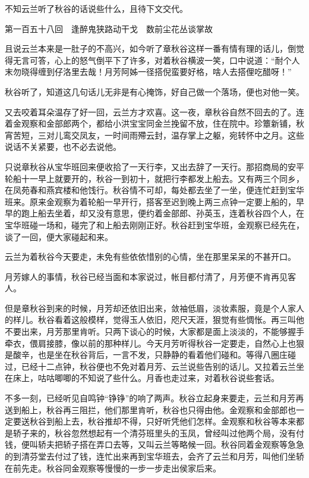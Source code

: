 \documentclass[12pt,UTF8]{ctexbook}
\begin{document}
{{{不知云兰听了秋谷的话说些什么，且待下文交代。





第一百五十八回　逢醉鬼狭路动干戈　数前尘花丛谈掌故





且说云兰本来是一肚子的不高兴，如今听了章秋谷这样一番有情有理的话儿，倒觉得无言可答，心上的怒气倒平下了许多，对着秋谷横波一笑，口中说道：“耐个人末勿晓得缠到仔洛里去哉！月芳阿姊一径搭倪蛮要好格，啥人去搭俚吃醋呀！”

秋谷听了，知道这几句话儿无非是有心掩饰，好自己做一个落场，便也对他一笑。

又去咬着耳朵温存了好一回，云兰方才欢喜。这一夜，章秋谷自然不回去的了。连着金观察和金部郎两个，都给小洪宝宝同金兰挽留不放，住在院中。珍簟新铺，秋宵苦短，三对儿鸾交凤友，一时间雨殢云封，温存掌上之躯，宛转怀中之月。这些说话不关紧要，也不必去说他。

只说章秋谷从宝华班回来便收拾了一天行李，又出去辞了一天行。那招商局的安平轮船十一早上就要开的，秋谷一到初十，就把行李都发上船去。又有两三个同乡，在凤苑春和燕宾楼和他饯行。秋谷情不可却，每处都去坐了一坐，便连忙赶到宝华班来。原来金观察为着轮船一早开行，搭客至迟到晚上两三点钟一定要上船的，早早的跑上船去坐着，却又没有意思，便约着金部郎、孙英玉，连着秋谷四个人，在宝华班碰一场和，碰完了和上船去刚刚正好。秋谷赶到宝华班，金观察已经先在，谈了一回，便大家碰起和来。

云兰为着秋谷今天要走，未免有些依依惜别的心情，坐在那里呆呆的不甚开口。

月芳嫁人的事情，秋谷已经当面和本家说过，帐目都付清了，月芳便不肯再见客人。

但是章秋谷到来的时候，月芳却还依旧出来，敛袖低眉，淡妆素服，竟是个人家人的样儿。秋谷看着这般模样，觉得玉人依旧，咫尺天涯，狠觉有些惆怅。再三叫他不要出来，月芳那里肯听。只两下谈心的时候，大家都是面上淡淡的，不能够握手牵衣，偎肩接膝，像以前的那种样儿。今天月芳听得秋谷一定要走，自然心上也狠是酸辛，也是坐在秋谷背后，一言不发，只静静的看着他们碰和。等得八圈庄碰过，已经十二点钟，秋谷便也不免对着月芳、云兰说些告别的话儿。又拉着云兰坐在床上，咕咕唧唧的不知说了些什么。月香也走过来，对着秋谷说些套话。

不多一刻，已经听见自鸣钟“铮铮”的响了两声。秋谷立起身来要走，云兰和月芳再送到船上，秋谷再三阻拦，他们那里肯听，秋谷也只得由他。金观察和金部郎也一定要送秋谷到船上去，秋谷推却不得，只好听凭他们怎样。金观察和秋谷等本来都是轿子来的，秋谷忽然想起有一个清芬班里头的玉凤，曾经叫过他两个局，没有付钱，便叫轿夫把轿子搭在弄口去等，又叫云兰等略候一回。秋谷同着金观察等急急的到清芬堂去付过了钱，连忙出来再到宝华班去，会齐了云兰和月芳，叫他们坐轿在前先走。秋谷同金观察等慢慢的一步一步走出侯家后来。

}}}
\end{document}
